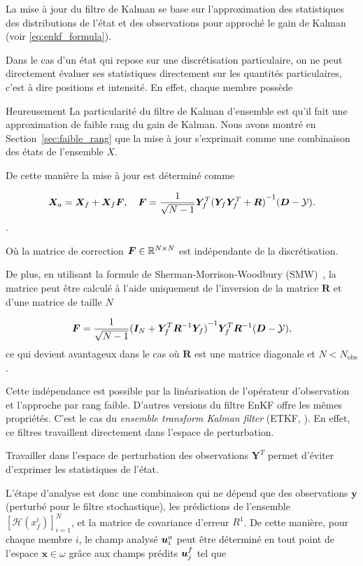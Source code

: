 La mise à jour du filtre de Kalman se base sur l'approximation des statistiques des distributions de l'état et des observations pour approché le gain de Kalman (voir \eqref{eq:enkf_formula}).

Dans le cas d'un état qui repose sur une discrétisation particulaire, on ne peut directement évaluer ses statistiques directement sur les quantités particulaires, c'est à dire positions et intensité. En effet, chaque membre possède


Heureusement La particularité du filtre de Kalman d'ensemble est qu'il fait une approximation de faible rang du gain de Kalman. Nous avons montré en Section~\ref{sec:faible_rang} que la mise à jour s'exprimait comme une combinaison des états de l'ensemble $X$.

De cette manière la mise à jour est déterminé comme

\begin{equation*}
    \bm{X}_a = \bm{X}_f + \bm{X}_f \bm{F}, \quad \bm{F} = \frac{1}{\sqrt{N-1}} \bm Y_f^T {(\bm Y_f \bm Y_f^T + \bm R)}^{-1}(\bm{D} - \mathcal{Y}).
\end{equation*}.

Où la matrice de correction $\bm{F} \in \mathbb{R}^{N\times N}$ est indépendante de la discrétisation.

De plus, en utilisant la formule de Sherman-Morrison-Woodbury (SMW)~\cite{SMW}, la matrice peut être calculé à l'aide uniquement de l'inversion de la matrice $\bm R$ et d'une matrice de taille $N$

\begin{equation*}
    \bm{F} = \frac{1}{\sqrt{N - 1}} {(\bm I_N + \bm Y_f^T\bm R^{-1}\bm Y_f)}^{-1}\bm Y_f^T \bm R^{-1} (\bm{D} - \mathcal{Y}),
\end{equation*}ce qui devient avantageux dans le cas où $\bm R$ est une matrice diagonale et $N < N_{\text{obs}}$.

Cette indépendance est possible par la linéarisation de l'opérateur d'observation et l'approche par rang faible. D'autres versions du filtre EnKF offre les mêmes propriétés. C'est le cas du \textit{ensemble transform Kalman filter} (ETKF, \cite{Hunt2007}). En effet, ce filtres travaillent directement dans l'espace de perturbation.

Travailler dans l'espace de perturbation des observations $\bm Y^T$ permet d'éviter d'exprimer les statistiques de l'état.

L'étape d'analyse est donc une combinaison qui ne dépend que des observations $\bm y$ (perturbé pour le filtre stochastique), les prédictions de l'ensemble $\left[\mathcal{H}(x^i_f)\right]_{i=1}^{N}$, et la matrice de covariance d'erreur $R^{1}$. De cette manière, pour chaque membre $i$, le champ analysé $\bm{u}_i^a$ peut être déterminé en tout point de l'espace $\bm x \in \omega$ grâce aux champs prédits $\bm{u}_j^f$ tel que

